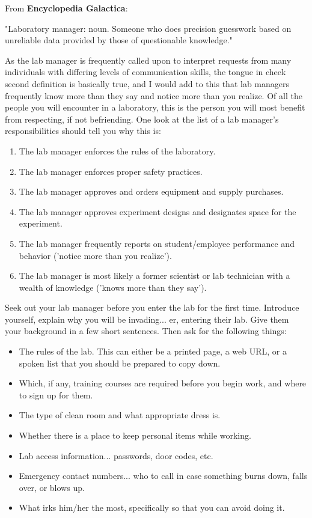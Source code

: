 \documentclass[11pt]{article}
\begin{document}
\hspace{-0.7cm} From \textbf{Encyclopedia Galactica}:

"Laboratory manager: noun. Someone who does precision guesswork based on unreliable data provided by those of questionable knowledge."\cite{adams}

\vspace{0.3cm}

\hspace{-0.7cm} As the lab manager is frequently called upon to interpret requests from many individuals with differing levels of communication skills, the tongue in cheek second definition is basically true, and I would add to this that lab managers frequently know more than they say and notice more than you realize. Of all the people you will encounter in a laboratory, this is the person you will most benefit from respecting, if not befriending. One look at the list of a lab manager's responsibilities should tell you why this is:

\begin{enumerate}[noitemsep]
  \item The lab manager enforces the rules of the laboratory.
  \item The lab manager enforces proper safety practices.
  \item The lab manager approves and orders equipment and supply purchases.
  \item The lab manager approves experiment designs and designates space for the experiment.
  \item The lab manager frequently reports on student/employee performance and behavior ('notice more than you realize').
  \item The lab manager is most likely a former scientist or lab technician with a wealth of knowledge ('knows more than they say').
\end{enumerate}

Seek out your lab manager before you enter the lab for the first time. Introduce yourself, explain why you will be invading... er, entering their lab. Give them your background in a few short sentences. Then ask for the following things:

\begin{itemize}[noitemsep]
  \item The rules of the lab. This can either be a printed page, a web URL, or a spoken list that you should be prepared to copy down.
  \item Which, if any, training courses are required before you begin work, and where to sign up for them.
  \item The type of clean room and what appropriate dress is.
  \item Whether there is a place to keep personal items while working.
  \item Lab access information... passwords, door codes, etc.
  \item Emergency contact numbers... who to call in case something burns down, falls over, or blows up.
  \item What irks him/her the most, specifically so that you can avoid doing it.
\end{itemize}
\end{document}
